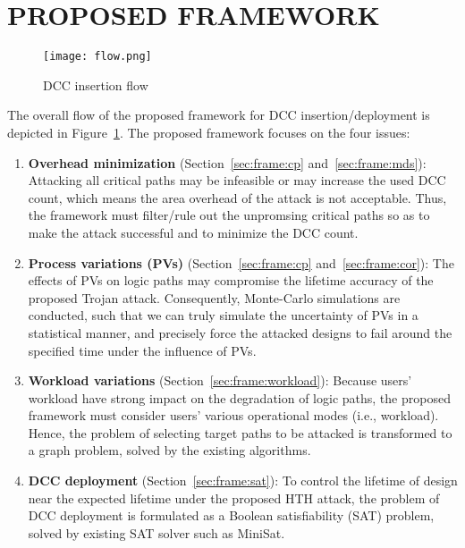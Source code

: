 \section{PROPOSED FRAMEWORK}
\label{sec:frame}
\begin{figure}
	\centering
	\texttt{[image: flow.png]}
	\caption{DCC insertion flow}
	\label{fig:flow}
\end{figure}
The overall flow of the proposed framework for DCC insertion/deployment is depicted in Figure~\ref{fig:flow}. The proposed framework focuses on the four issues: 
\begin{enumerate}[wide, labelwidth=!, labelindent=0pt]%
	\item \textbf{Overhead minimization} (Section~\ref{sec:frame:cp} and~\ref{sec:frame:mds}): Attacking all critical paths may be infeasible or may increase the used DCC count, which means the area overhead of the attack is not acceptable. Thus, the framework must filter/rule out the unpromsing critical paths so as to make the attack successful and to minimize the DCC count. %
	\item \textbf{Process variations (PVs)} (Section~\ref{sec:frame:cp} and~\ref{sec:frame:cor}): The effects of PVs on logic paths may compromise the lifetime accuracy of the proposed Trojan attack. Consequently, Monte-Carlo simulations are conducted, such that we can truly simulate the uncertainty of PVs in a statistical manner, and precisely force the attacked designs to fail around the specified time under the influence of PVs. %
	\item \textbf{Workload variations} (Section~\ref{sec:frame:workload}): Because users' workload have strong impact on the degradation of logic paths, the proposed framework must consider users' various operational modes (i.e., workload). Hence, the problem of selecting target paths to be attacked is transformed to a graph problem, solved by the existing algorithms. %
	\item \textbf{DCC deployment} (Section~\ref{sec:frame:sat}): To control the lifetime of design near the expected lifetime under the proposed HTH attack, the problem of DCC deployment is formulated as a Boolean satisfiability (SAT) problem, solved by existing SAT solver such as MiniSat.
\end{enumerate}


